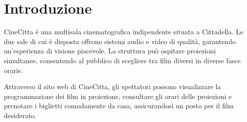 \section{Introduzione}

CineCitta è una multisala cinematografica indipendente situata a Cittadella. Le due sale di cui è disposta offrono sistemi audio e video di qualità, garantendo un'esperienza di visione piacevole. La struttura può ospitare proiezioni simultanee, consentendo al pubblico di scegliere tra film diversi in diverse fasce orarie.

Attraverso il sito web di CineCitta, gli spettatori possono visualizzare la programmazione dei film in proiezione, consultare gli orari delle proiezioni e prenotare i biglietti comodamente da casa, assicurandosi un posto per il film desiderato.